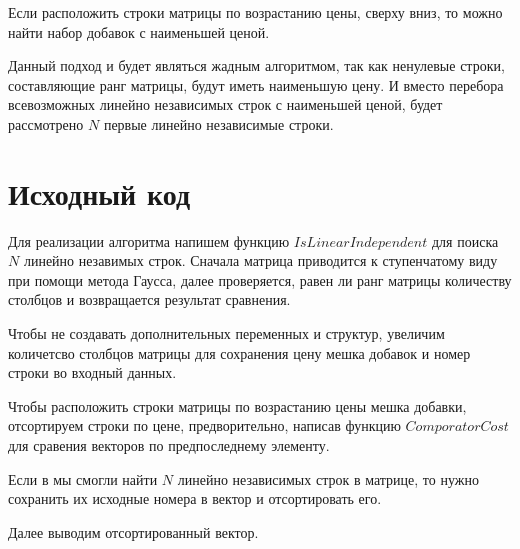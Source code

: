 Если расположить строки матрицы по возрастанию цены, сверху вниз, то можно найти набор добавок с наименьшей ценой.

Данный подход и будет являться жадным алгоритмом, так как ненулевые строки, составляющие ранг матрицы, будут иметь наименьшую цену.
И вместо перебора всевозможных линейно независимых строк с наименьшей ценой, будет рассмотрено $N$ первые линейно независимые строки.

\pagebreak

\section{Исходный код}

Для реализации алгоритма напишем функцию $IsLinearIndependent$ для поиска $N$ линейно незавимых строк. Сначала матрица приводится к ступенчатому виду
при помощи метода Гаусса, далее проверяется, равен ли ранг матрицы количеству столбцов и возвращается результат сравнения.

Чтобы не создавать дополнительных переменных и структур, увеличим количетсво столбцов матрицы для сохранения цену мешка добавок
и номер строки во входный данных.

Чтобы расположить строки матрицы по возрастанию цены мешка добавки, отсортируем строки по цене, предворительно, 
написав функцию $ComporatorCost$ для сравения векторов по предпоследнему элементу.

Если в мы смогли найти $N$ линейно независимых строк в матрице, то нужно сохранить их исходные номера в вектор и отсортировать его.

Далее выводим отсортированный вектор.

